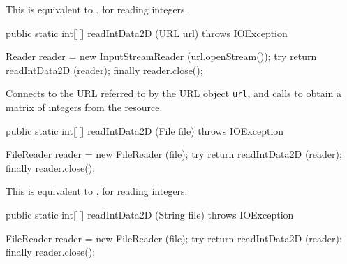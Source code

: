 \begin{tabb}   This is equivalent to ,
 for reading integers.
\end{tabb}
\begin{htmlonly}
\end{htmlonly}
\begin{code}

   public static int[][] readIntData2D (URL url) throws IOException\begin{hide} {
      Reader reader = new InputStreamReader (url.openStream());
      try {
         return readIntData2D (reader);
      }
      finally {
         reader.close();
      }
   }\end{hide}
\end{code}
\begin{tabb}   Connects to the URL referred to by the URL object \texttt{url},
 and calls  to
 obtain a matrix of integers from
 the resource.
\end{tabb}
\begin{htmlonly}
\end{htmlonly}
\begin{code}

   public static int[][] readIntData2D (File file) throws IOException\begin{hide} {
      FileReader reader = new FileReader (file);
      try {
         return readIntData2D (reader);
      }
      finally {
         reader.close();
      }
   }\end{hide}
\end{code}
\begin{tabb}   This is equivalent to ,
   for reading integers.
\end{tabb}
\begin{htmlonly}
\end{htmlonly}
\begin{code}

   public static int[][] readIntData2D (String file) throws IOException\begin{hide} {
      FileReader reader = new FileReader (file);
      try {
         return readIntData2D (reader);
      }
      finally {
         reader.close();
      }
   }\end{hide}
\end{code}
